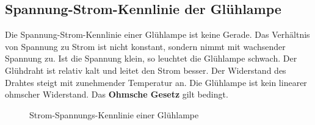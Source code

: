 \subsection{Spannung-Strom-Kennlinie der Glühlampe}
Die Spannung-Strom-Kennlinie einer Glühlampe ist keine Gerade. Das Verhältnis von Spannung zu Strom ist nicht konstant, sondern nimmt mit wachsender Spannung zu. Ist die Spannung klein, so leuchtet die Glühlampe schwach. Der Glühdraht ist relativ kalt und leitet den Strom besser. Der Widerstand des Drahtes steigt mit zunehmender Temperatur an. Die Glühlampe ist kein linearer ohmscher Widerstand. Das \textbf{Ohmsche Gesetz} gilt bedingt.
\begin{figure}[H]
\centering
{}
\caption{Strom-Spannungs-Kennlinie einer Glühlampe}
\end{figure} 
